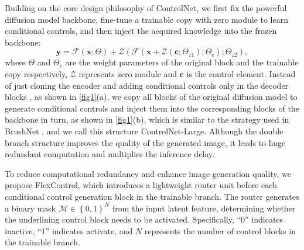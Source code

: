 Building on the core design philosophy of ControlNet, we first fix the powerful diffusion model backbone, fine-tune a trainable copy with zero module to learn conditional controls, and then inject the acquired knowledge into the frozen backbone:
\begin{equation}
    \mathbf{y}=\mathcal{F}\left(\mathbf{x};\Theta \right) + \mathcal{Z}\left(\mathcal{F}\left(\mathbf{x}+\mathcal{Z}\left(\mathbf{c};\Theta_{z1}\right);\Theta_{c}\right);\Theta_{z2}\right),
\label{eq:inject_conditional_controls}
\end{equation}
where $\Theta$ and $\Theta_{c}$ are the weight parameters of the original block and the trainable copy respectively, $\mathcal{Z}$ represents zero module and $\mathbf{c}$ is the control element. Instead of just cloning the encoder and adding conditional controls only in the decoder blocks \cite{zhang2023adding}, as shown in \cref{fig1}(a), we copy all blocks of the original diffusion model to generate conditional controls and inject them into the corresponding blocks of the backbone in turn, as shown in \cref{fig1}(b), which is similar to the strategy used in BrushNet \cite{ju2024brushnet}, and we call this structure ControlNet-Large. Although the double branch structure improves the quality of the generated image, it leads to huge redundant computation and multiplies the inference delay. 

To reduce computational redundancy and enhance image generation quality, we propose FlexControl, which introduces a lightweight router unit before each conditional control generation block in the trainable branch.  The router generates a binary mask $\mathcal{M}\in\left\{0,1\right\}^{N}$ from the input latent feature, determining whether the underlining control block needs to be activated.  Specifically, ``0'' indicates inactive, ``1'' indicates activate, and $N$ represents the number of control blocks in the trainable branch. 

